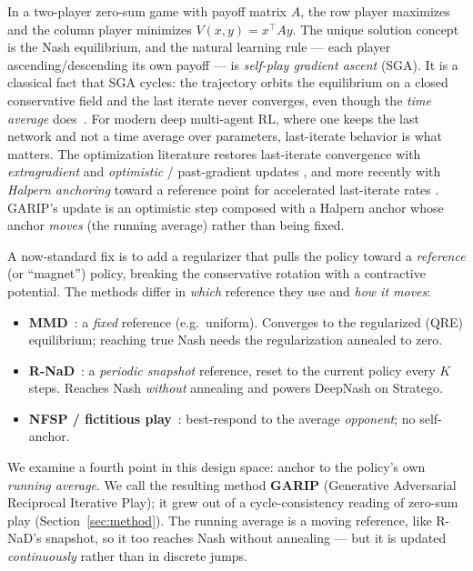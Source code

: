 \documentclass[10pt,twocolumn]{article}
\theoremstyle{plain}
\theoremstyle{remark}
\begin{document}
In a two-player zero-sum game with payoff matrix $A$, the row player maximizes
and the column player minimizes $V(x,y)=x^\top A y$. The unique solution
concept is the Nash equilibrium, and the natural learning rule --- each player
ascending/descending its own payoff --- is \emph{self-play gradient ascent}
(SGA). It is a classical fact that SGA cycles: the trajectory orbits the
equilibrium on a closed conservative field and the last iterate never
converges, even though the \emph{time average} does~\cite{golowich2020last}. For
modern deep multi-agent RL, where one keeps the last network and not a time
average over parameters, last-iterate behavior is what matters. The optimization
literature restores last-iterate convergence with \emph{extragradient}
\cite{korpelevich1976} and \emph{optimistic} / past-gradient updates
\cite{popov1980,rakhlin2013optimistic,daskalakis2018optimistic,mertikopoulos2019omd},
and more recently with \emph{Halpern anchoring} toward a reference point for
accelerated last-iterate rates \cite{halpern1967,yoon2021accelerated,cai2022finite}.
GARIP's update is an optimistic step composed with a Halpern anchor whose anchor
\emph{moves} (the running average) rather than being fixed.

A now-standard fix is to add a regularizer that pulls the policy toward a
\emph{reference} (or ``magnet'') policy, breaking the conservative rotation
with a contractive potential. The methods differ in \emph{which} reference they
use and \emph{how it moves}:
\begin{itemize}
  \item \textbf{MMD}~\cite{sokota2023mmd}: a \emph{fixed} reference (e.g.\
  uniform). Converges to the regularized (QRE) equilibrium; reaching true Nash
  needs the regularization annealed to zero.
  \item \textbf{R-NaD}~\cite{perolat2022rnad}: a \emph{periodic snapshot}
  reference, reset to the current policy every $K$ steps. Reaches Nash
  \emph{without} annealing and powers DeepNash on Stratego.
  \item \textbf{NFSP / fictitious play}~\cite{heinrich2016nfsp}: best-respond to
  the average \emph{opponent}; no self-anchor.
\end{itemize}

We examine a fourth point in this design space: anchor to the policy's own
\emph{running average}. We call the resulting method \textbf{GARIP}
(Generative Adversarial Reciprocal Iterative Play); it grew out of a
cycle-consistency reading of zero-sum play (Section~\ref{sec:method}). The
running average is a moving reference, like R-NaD's snapshot, so it too reaches
Nash without annealing --- but it is updated \emph{continuously} rather than in
discrete jumps.
\end{document}
